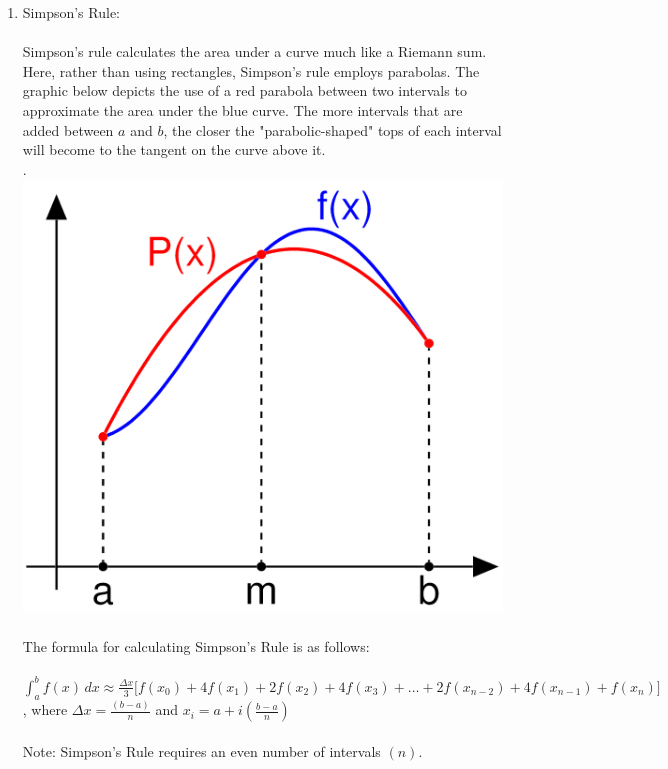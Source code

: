 \documentclass{report}
\begin{document}
\begin{enumerate}
\item Simpson's Rule:
\\
\\
Simpson's rule calculates the area under a curve much like a Riemann sum. Here, rather than using rectangles, Simpson's rule employs parabolas. The graphic below depicts the use of a red parabola between two intervals to approximate the area under the blue curve. The more intervals that are added between $a$ and $b$, the closer the "parabolic-shaped" tops of each interval will become to the tangent on the curve above it.
\\. \hspace{30 mm} \includegraphics[scale=.10]{simpson.png}
\\
\\
The formula for calculating Simpson's Rule is as follows:
\\
\\ $\displaystyle \int^b_a f(x)\,dx  \approx  \frac{\Delta x}{3}\Big[f(x_{0})+4f(x_1)+2f(x_2)+4f(x_3)+\ldots+2f(x_{n-2})+4f(x_{n-1})+f(x_n)\Big]$, \hspace{4 mm} where $\displaystyle \Delta x = \frac{(b-a)}{n}$ 
\hspace{7 mm} and \hspace{7 mm} $\displaystyle x_i = a + i(\frac{b-a}{n})$
\\
\\Note: Simpson's Rule requires an even number of intervals $(n)$. 

\end{enumerate}
\end{document}
